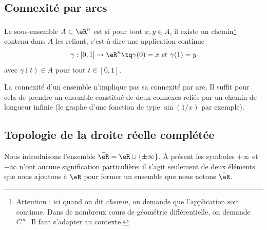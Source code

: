 \subsection{Connexité par arcs}

\begin{definition}
  Le sous-ensemble $A \subset \eR^n$ est  si pour tout $x, y \in A$, il existe un chemin\footnote{Attention : ici quand on dit \emph{chemin}, on demande que l'application soit continue. Dans de nombreux cours de géométrie différentielle, on demande $ C^{\infty}$. Il faut s'adapter au contexte.} contenu dans $A$ les reliant, c'est-à-dire une application continue
  \begin{equation*}
    \gamma : [0,1] \to \eR^n \tq \gamma(0) = x~\text{et}~\gamma(1) = y
  \end{equation*}
  avec $\gamma(t) \in A$ pour tout $t\in [0,1]$.
\end{definition}

\begin{normaltext}      \label{NORMooQXKVooXOmMlX}
    La connexité d'un ensemble n'implique pas sa connexité par arc. Il suffit pour cela de prendre un ensemble constitué de deux connexes reliés par un chemin de longueur infinie (le graphe d'une fonction de type \( \sin(1/x)\) par exemple).
\end{normaltext}


\subsection{Topologie de la droite réelle complétée}
\label{SUBSECooKRRUooSlZSmM}

Nous introduisons l'ensemble \( \bar\eR=\eR\cup\{ \pm\infty \}\). À présent les symboles \( +\infty\) et \( -\infty\) n'ont aucune signification particulière; il s'agit seulement de deux éléments que nous ajoutons à \( \eR\) pour former un ensemble que nous notons \( \bar \eR\).

